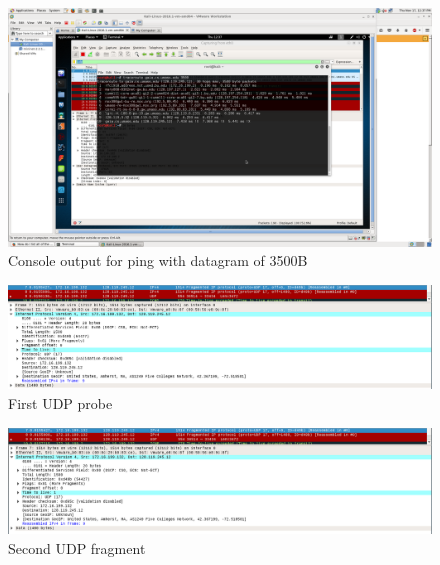 \documentclass[12pt]{article}
\begin{document}
\begin{figure}[H]
	\caption{Console output for ping with datagram of 3500B}
	\centering
	\includegraphics[width=\textwidth,height=\textheight,keepaspectratio,scale=0.5=0.5]{tr3500}
\end{figure}

\begin{figure}[H]
	\caption{First UDP probe}
	\centering
	\includegraphics[width=\textwidth,height=\textheight,keepaspectratio,scale=0.5=0.5]{firstFrag}
\end{figure}

\begin{figure}[H]
	\caption{Second UDP fragment}
	\centering
	\includegraphics[width=\textwidth,height=\textheight,keepaspectratio,scale=0.5=0.5]{2ndFrag}
\end{figure}
\end{document}
